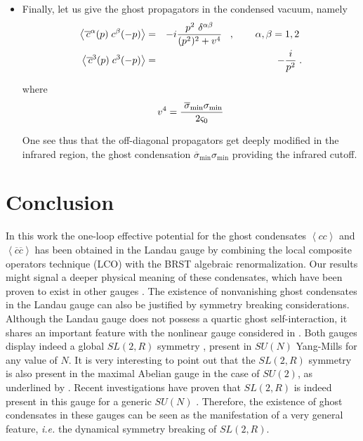 \documentclass[a4paper,12pt]{article}
\begin{document}
\begin{itemize}
\item  Finally, let us give the ghost propagators in the condensed vacuum,
namely
\begin{eqnarray}
\left\langle \overline{\,c}^{\alpha }(p)\;c^{\beta }(-p)\right\rangle  &=&-i%
\frac{p^{2}\,\,\delta ^{\alpha \beta }}{(p^{2})^{2}+v^{4}}%
\,\,\,\,\,,\;\;\,\;\;\;\;\;\alpha ,\beta =1,2\;  \nonumber \\
\left\langle \overline{\,c}^{3}(p)\;c^{3}(-p)\right\rangle  &=&-\frac{i}{%
p^{2}}\;.  \label{prop}
\end{eqnarray}

where 
\begin{equation}
v^{4}=\frac{\,\,\overline{\sigma }_{\mathrm{\min }}\sigma _{\mathrm{\min }}}{%
2\varsigma _{0}}  \label{cond}
\end{equation}

One see thus that the off-diagonal propagators get deeply modified in the
infrared region, the ghost condensation $\overline{\sigma }_{\mathrm{\min }}\sigma _{\mathrm{\min }}$ providing the infrared cutoff.
\end{itemize}


\section{Conclusion}

In this work the one-loop effective potential for the ghost condensates $%
\left\langle cc\right\rangle $ and $\left\langle \overline{c}\overline{c}%
\right\rangle \;$has been obtained in the Landau gauge by combining the
local composite operators  technique (LCO) with the BRST algebraic
renormalization. Our results might signal a deeper physical meaning of these
condensates, which have been proven to exist in other gauges \cite
{ms,k,sp,cf,cf1,cf2}. The existence of nonvanishing ghost condensates in the
Landau gauge can also be justified by symmetry breaking considerations.
Although the Landau gauge does not possess a quartic ghost self-interaction,
it shares an important feature with the nonlinear gauge considered in \cite
{cf,cf1,cf2}. Both gauges display indeed a global $SL(2,R)$ symmetry \cite
{sl2r}, present in $SU(N)$ Yang-Mills for any value of $N$. It is very
interesting to point out that the $SL(2,R)$ symmetry is also present in the
maximal Abelian gauge in the case of $SU(2)$, as underlined by \cite{ms}.
Recent investigations have proven that $SL(2,R)$ is indeed present in this
gauge for a generic $SU(N)$ \cite{work}. Therefore, the existence of ghost
condensates in these gauges can be seen as the manifestation of a very
general feature, \textit{i.e. }the dynamical symmetry breaking of $SL(2,R)$.
\end{document}

